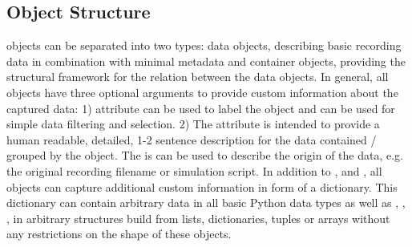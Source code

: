 \subsection{ Object Structure}
 objects can be separated into two types: data objects, describing basic recording data in combination with minimal metadata and container objects, providing the structural framework for the relation between the data objects. In general, all  objects have three optional arguments to provide custom information about the captured data: 1)  attribute can be used to label the object and can be used for simple data filtering and selection. 2) The  attribute is intended to provide a human readable, detailed, 1-2 sentence description for the data contained / grouped by the  object. The  is can be used to describe the origin of the data, e.g. the original recording filename or simulation script. In addition to ,  and , all  objects can capture additional custom information in form of a  dictionary. This dictionary can contain arbitrary data in all basic Python data types as well as , , ,  in arbitrary structures build from lists, dictionaries, tuples or  arrays without any restrictions on the shape of these objects.


